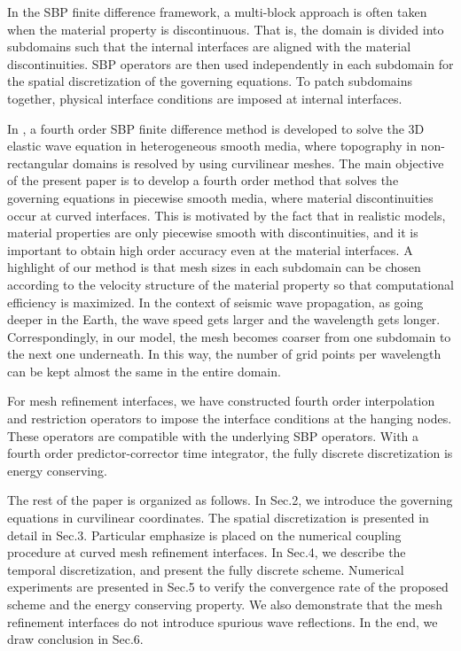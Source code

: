 In the SBP finite difference framework, a multi-block approach is often taken when the material property is discontinuous. That is, the domain is divided into subdomains such that the internal interfaces are aligned with the material discontinuities. SBP operators are then used independently in each subdomain for the spatial discretization of the governing equations. To patch subdomains together, physical interface conditions are imposed at internal interfaces. 



In \cite{petersson2015wave}, a fourth order SBP finite difference method is developed to solve the 3D elastic wave equation in heterogeneous smooth media, where topography in non-rectangular domains is resolved by using curvilinear meshes. The main objective of the present paper is to develop a fourth order method that solves the governing equations in piecewise smooth media, where material discontinuities occur at curved interfaces. This is motivated by the fact that in realistic models, material properties are only piecewise smooth with discontinuities, and it is important to obtain high order accuracy even at the material interfaces. A highlight of our method is that  mesh sizes in each subdomain can be chosen according to the velocity structure of the material property so that computational efficiency is maximized. In the context of seismic wave propagation, as going deeper in the Earth, the wave speed gets larger and the wavelength gets longer. Correspondingly, in our model, the mesh becomes coarser from one subdomain to the next one underneath. In this way, the number of grid points per wavelength can be kept almost the same in the entire domain. 

For mesh refinement interfaces, we have constructed fourth order interpolation and restriction operators to impose the interface conditions at the hanging nodes. These operators are compatible with the underlying SBP operators. With a fourth order predictor-corrector time integrator, the fully discrete discretization is energy conserving. 

The rest of the paper is organized as follows. In Sec.2, we introduce the governing equations in curvilinear coordinates. The spatial discretization is presented in detail in Sec.3. Particular emphasize is placed on the numerical coupling procedure at curved mesh refinement interfaces. In Sec.4, we describe the temporal discretization, and present the fully discrete scheme. Numerical experiments are presented in Sec.5 to verify the convergence rate of the proposed scheme and the energy conserving property. We also demonstrate that the mesh refinement interfaces do not introduce spurious wave reflections. In the end, we draw conclusion in Sec.6. 
